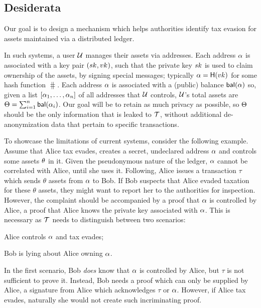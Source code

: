 \subsection{Desiderata}\label{sec:taxation}

Our goal is to design a mechanism which helps authorities identify tax evasion
for assets maintained via a distributed ledger.

In such systems, a user $\mathcal{U}$ manages their assets via addresses. Each
address $\alpha$ is associated with a key pair $(sk_{}, vk_{})$, such that the
private key $sk$ is used to claim ownership of the assets, \eg by signing
special messages; typically $\alpha = \mathsf{H}(vk)$ for some hash
function $\hash$. Each address $\alpha$ is associated with a (public) balance
$\mathsf{bal}(\alpha)$ so, given a list $[\alpha_1, \dots, \alpha_n]$ of all
addresses that $\mathcal{U}$ controls, $\mathcal{U}$'s total assets are $\Theta =
\sum_{i=1}^n \mathsf{bal}(\alpha_i)$. Our goal will be to retain as much privacy
as possible, so $\Theta$ should be the only information that is leaked to
$\mathcal{T}$, without additional de-anonymization data that pertain to specific
transactions.

To showcase the limitations of current systems, consider the following example.
Assume that Alice tax evades, \ie creates a secret, undeclared address
$\alpha$ and controls some assets $\theta$ in it. Given the pseudonymous
nature of the ledger, $\alpha$ cannot be correlated with Alice, until she
uses it. Following, Alice issues a transaction $\tau$ which sends $\theta$
assets from $\alpha$ to Bob. If Bob suspects that Alice evaded taxation for
these $\theta$ assets, they might want to report her to the authorities for
inspection. However, the complaint should be accompanied by a proof that
$\alpha$ is controlled by Alice, \ie a proof that Alice knows the private key
associated with $\alpha$. This is necessary as $\mathcal{T}$ needs to
distinguish between two scenarios:
\begin{inparaenum}[i)]
    \item Alice controls $\alpha$ and tax evades;
    \item Bob is lying about Alice owning $\alpha$.
\end{inparaenum}
In the first scenario, Bob \emph{does} know that $\alpha$ is controlled by
Alice, but $\tau$ is not sufficient to prove it.
Instead, Bob needs a proof which can only be supplied by Alice, \eg a signature
from Alice which acknowledges $\tau$ or $\alpha$. However, if Alice tax
evades, naturally she would not create such incriminating proof.

